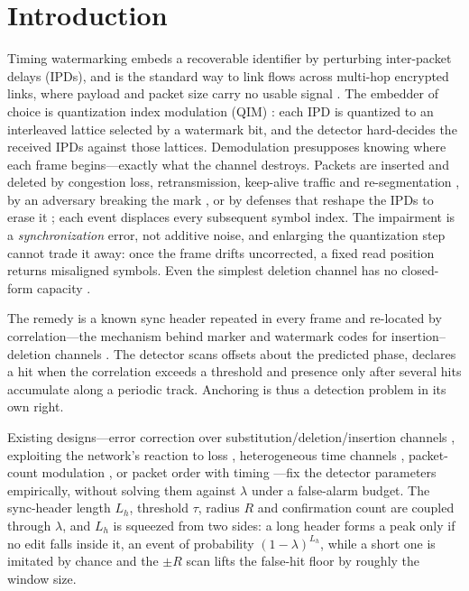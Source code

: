 \documentclass[journal]{IEEEtran}
\newcommand{\Lh}{L_h}
\begin{document}
\IEEEpeerreviewmaketitle

\section{Introduction}
\label{sec:intro}
Timing watermarking embeds a recoverable identifier by perturbing inter-packet delays (IPDs), and is the standard way to link flows across multi-hop encrypted links, where payload and packet size carry no usable signal \cite{Wang2003Stepping,Li2026Survey}. The embedder of choice is quantization index modulation (QIM) \cite{ChenWornell2001QIM}: each IPD is quantized to an interleaved lattice selected by a watermark bit, and the detector hard-decides the received IPDs against those lattices. Demodulation presupposes knowing where each frame begins---exactly what the channel destroys. Packets are inserted and deleted by congestion loss, retransmission, keep-alive traffic and re-segmentation \cite{Paxson1999E2E,Bennett1999Reorder}, by an adversary breaking the mark \cite{Lin2012}, or by defenses that reshape the IPDs to erase it \cite{Yuan2025DeMarking}; each event displaces every subsequent symbol index. The impairment is a \emph{synchronization} error, not additive noise, and enlarging the quantization step cannot trade it away: once the frame drifts uncorrected, a fixed read position returns misaligned symbols. Even the simplest deletion channel has no closed-form capacity \cite{Mitzenmacher2009Survey}.

The remedy is a known sync header repeated in every frame and re-located by correlation---the mechanism behind marker and watermark codes for insertion--deletion channels \cite{DaveyMacKay2001}. The detector scans offsets about the predicted phase, declares a hit when the correlation exceeds a threshold and presence only after several hits accumulate along a periodic track. Anchoring is thus a detection problem in its own right.

Existing designs---error correction over substitution/deletion/insertion channels \cite{Gong2013Invisible}, exploiting the network's reaction to loss \cite{Iacovazzi2018DropWat}, heterogeneous time channels \cite{Li2022HeteroTiC}, packet-count modulation \cite{Qiao2025DynMark}, or packet order with timing \cite{Feng2024HSTW}---fix the detector parameters empirically, without solving them against $\lambda$ under a false-alarm budget. The sync-header length $\Lh$, threshold $\tau$, radius $R$ and confirmation count are coupled through $\lambda$, and $\Lh$ is squeezed from two sides: a long header forms a peak only if no edit falls inside it, an event of probability $(1-\lambda)^{\Lh}$, while a short one is imitated by chance and the $\pm R$ scan lifts the false-hit floor by roughly the window size.
\end{document}
